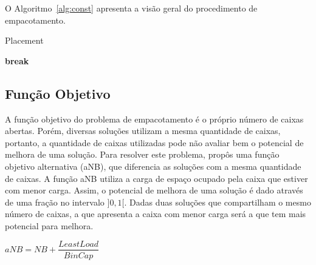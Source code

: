 \documentclass[article]{rian_article}
\begin{document}
O Algoritmo~\ref{alg:const} apresenta a visão geral do procedimento de empacotamento.

\begin{algorithm}[hbtp]
\caption{Placement}
\label{alg:const}
\begin{algorithmic}[1]
\footnotesize
{}
				\State \textbf{break}
			\EndIf
		\EndFor
		\Else
		\EndIf
	\EndFor
\EndProcedure
\end{algorithmic}
\end{algorithm}

\subsection{Função Objetivo}
A função objetivo do problema de empacotamento é o próprio número de caixas abertas. Porém, diversas soluções utilizam a mesma quantidade de caixas, portanto, a quantidade de caixas utilizadas pode não avaliar bem o potencial de melhora de uma solução.
Para resolver este problema, \citet{resende2013} propôs uma função
objetivo alternativa (aNB), que diferencia as soluções com a mesma quantidade de caixas. A função aNB utiliza a carga de espaço ocupado pela caixa que estiver com menor carga. Assim, o potencial de melhora de uma solução é dado através de uma fração no intervalo $]0, 1[$. Dadas duas soluções que compartilham o mesmo número de caixas, a que apresenta a caixa com
menor carga será a que tem mais potencial para melhora.

\begin{center}
$aNB = NB + \dfrac{LeastLoad}{BinCap}$
\end{center}
\end{document}
